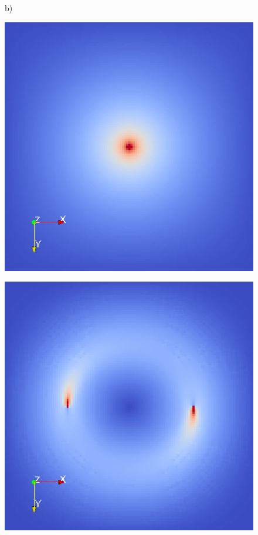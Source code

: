 \documentclass{scrartcl}
\begin{document}
\begin{figure}[!t]
\centering
   b)
  \begin{minipage}{0.25\textwidth}
    \centering
    \includegraphics[height=0.8\textwidth]{iso_sat.png}
    \label{a)}
  \end{minipage}
  \begin{minipage}{0.25\textwidth}
    \centering
    \includegraphics[height=0.8\textwidth]{cos_parallel.png}
    \label{b)}
  \end{minipage}
  \begin{minipage}{0.25\textwidth}
    \centering

\end{minipage}
\end{figure}
\end{document}
